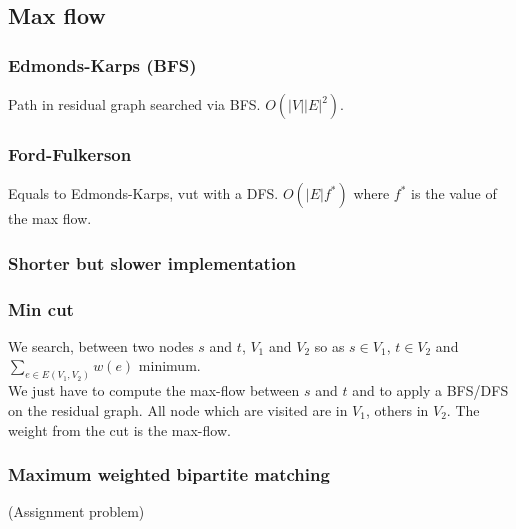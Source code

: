 \subsection{Max flow}
\subsubsection{Edmonds-Karps (BFS)}
Path in residual graph searched via BFS. $O(|V||E|^2)$.\\

\subsubsection{Ford-Fulkerson}
Equals to Edmonds-Karps, vut with a DFS. $O(|E|f^*)$ where $f^*$ is the value of the max flow.
\subsubsection{Shorter but slower implementation}

\subsubsection{Min cut}
We search, between two nodes $s$ and $t$, $V_1$ and $V_2$ so as $s\in V_1$, $t\in V_2$ and $\sum_{e \in E(V_1, V_2)} w(e)$ minimum.\\
We just have to compute the max-flow between $s$ and $t$ and to apply a BFS/DFS on the residual graph. All node which are visited are in $V_1$, others in $V_2$. The weight from the cut is the max-flow.
\subsubsection{Maximum weighted bipartite matching}
(Assignment problem)
